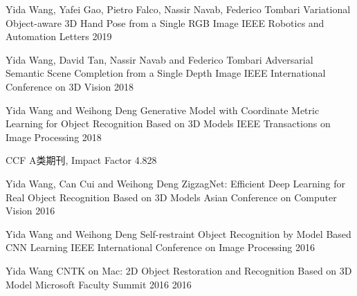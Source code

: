 


\begin{cventries}

\cventry
{Yida Wang, Yafei Gao, Pietro Falco, Nassir Navab, Federico Tombari} %
{Variational Object-aware 3D Hand Pose from a Single RGB Image} %
{IEEE Robotics and Automation Letters} %
{2019} %
{ %
}

\cventry
{Yida Wang, David Tan, Nassir Navab and Federico Tombari} %
{Adversarial Semantic Scene Completion from a Single Depth Image} %
{IEEE International Conference on 3D Vision} %
{2018} %
{ %
}

\cventry
{Yida Wang and Weihong Deng} %
{Generative Model with Coordinate Metric Learning for Object Recognition Based on 3D Models} %
{IEEE Transactions on Image Processing} %
{2018} %
{ %
\begin{cvitems}
 \item {CCF A类期刊, Impact Factor 4.828}
\end{cvitems}
}

\cventry
{Yida Wang, Can Cui and Weihong Deng} %
{ZigzagNet: Efficient Deep Learning for Real Object Recognition Based on 3D Models} %
{Asian Conference on Computer Vision} %
{2016} %
{ %
}


\cventry
{Yida Wang and Weihong Deng} %
{Self-restraint Object Recognition by Model Based CNN Learning} %
{IEEE International Conference on Image Processing} %
{2016} %
{ %
}


\cventry
{Yida Wang} %
{CNTK on Mac: 2D Object Restoration and Recognition Based on 3D Model} %
{Microsoft Faculty Summit 2016} %
{2016} %
{ %
}


\end{cventries}
